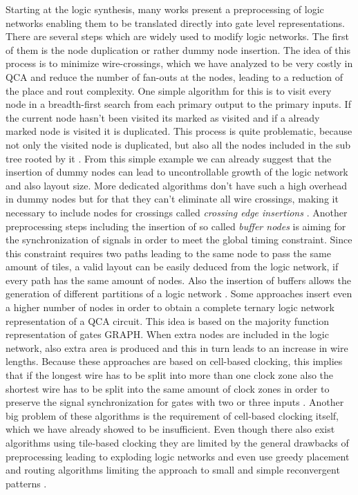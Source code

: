 Starting at the logic synthesis, many works present a preprocessing of logic networks enabling them to be translated directly into gate level representations. There are several steps which are widely used to modify logic networks. The first of them is the node duplication or rather dummy node insertion. The idea of this process is to minimize wire-crossings, which we have analyzed to be very costly in QCA and reduce the number of fan-outs at the nodes, leading to a reduction of the place and rout complexity. One simple algorithm for this is to visit every node in a breadth-first search from each primary output to the primary inputs. If the current node hasn't been visited its marked as visited and if a already marked node is visited it is duplicated. This process is quite problematic, because not only the visited node is duplicated, but also all the nodes included in the sub tree rooted by it \cite{QCA-LG}. From this simple example we can already suggest that the insertion of dummy nodes can lead to uncontrollable growth of the logic network and also layout size. More dedicated algorithms don't have such a high overhead in dummy nodes but for that they can't eliminate all wire crossings, making it necessary to include nodes for crossings called \textit{crossing edge insertions} \cite{node_duplication}. Another preprocessing steps including the insertion of so called \textit{buffer nodes} is aiming for the synchronization of signals in order to meet the global timing constraint. Since this constraint requires two paths leading to the same node to pass the same amount of tiles, a valid layout can be easily deduced from the logic network, if every path has the same amount of nodes. Also the insertion of buffers allows the generation of different partitions of a logic network \cite{dummy_and_buffer_nodes}. Some approaches insert even a higher number of nodes in order to obtain a complete ternary logic network representation of a QCA circuit. This idea is based on the majority function representation of gates GRAPH. When extra nodes are included in the logic network, also extra area is produced and this in turn leads to an increase in wire lengths. Because these approaches are based on cell-based clocking, this implies that if the longest wire has to be split into more than one clock zone also the shortest wire has to be split into the same amount of clock zones in order to preserve the signal synchronization for gates with two or three inputs \cite{QCA-LG}. Another big problem of these algorithms is the requirement of cell-based clocking itself, which we have already showed to be insufficient. Even though there also exist algorithms using tile-based clocking they are limited by the general drawbacks of preprocessing \cite{trindade2016placement} leading to exploding logic networks and even use greedy placement and routing algorithms limiting the approach to small and simple reconvergent patterns \cite{greedy_tile}.\\

